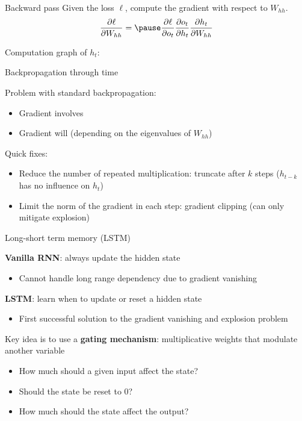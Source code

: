 \documentclass[usenames,dvipsnames,notes,11pt,aspectratio=169,hyperref={colorlinks=true, linkcolor=blue}]{beamer}
\newcommand{\pt}{\partial}
\begin{document}
\begin{frame}
    {Backward pass}
    Given the loss $\ell$, compute the gradient with respect to $W_{hh}$.
    $$
    \frac{\pt\ell}{\pt W_{hh}} = \pause \frac{\pt\ell}{\pt o_t} \frac{\pt o_t}{\pt h_t} \frac{\pt h_t}{\pt W_{hh}}
    $$

    \pause
    Computation graph of $h_t$:
    \vspace{10em}
\end{frame}

\begin{frame}
    {Backpropagation through time}
    
    Problem with standard backpropagation:\\
    \begin{itemize}
        \item Gradient involves 
        \item Gradient will  (depending on the eigenvalues of $W_{hh}$)
    \end{itemize}

    Quick fixes:\\
    \begin{itemize}
        \item Reduce the number of repeated multiplication: truncate after $k$ steps ($h_{t-k}$ has no influence on $h_t$)
        \item Limit the norm of the gradient in each step: gradient clipping (can only mitigate explosion)
    \end{itemize}
\end{frame}

\begin{frame}
    {Long-short term memory (LSTM)}

    \textbf{Vanilla RNN}: always update the hidden state\\
    \begin{itemize}
        \item Cannot handle long range dependency due to gradient vanishing 
    \end{itemize}
    \pause

    \textbf{LSTM}: learn when to update or reset a hidden state\\
    \begin{itemize}
        \item First successful solution to the gradient vanishing and explosion problem 
    \end{itemize}
    \pause

    Key idea is to use a \textbf{gating mechanism}: multiplicative weights that modulate another variable \\
    \begin{itemize}
        \item How much should a given input affect the state?
        \item Should the state be reset to 0?
        \item How much should the state affect the output? 
    \end{itemize}
\end{frame}
\end{document}
